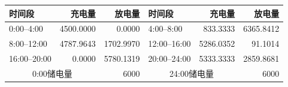 \small\begin{tabular}{lrrlrr}\toprule 时间段 & 充电量 & 放电量 & 时间段 & 充电量 & 放电量\\\midrule
0:00--4:00 & 4500.0000 & 0.0000 & 4:00--8:00 & 833.3333 & 6365.8412\\
8:00--12:00 & 4787.9643 & 1702.9970 & 12:00--16:00 & 5286.0352 & 91.1014\\
16:00--20:00 & 0.0000 & 5780.1319 & 20:00--24:00 & 5333.3333 & 2859.8681\\
\midrule\multicolumn{2}{c}{0:00储电量} & 6000 & \multicolumn{2}{c}{24:00储电量} & 6000\\
\bottomrule\end{tabular}
